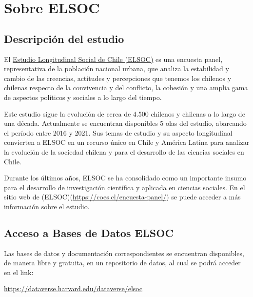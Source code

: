 \documentclass[
  12pt,
]{book}
\begin{document}
\hypertarget{sobre-elsoc}{%
\section*{Sobre ELSOC}\label{sobre-elsoc}}

\hypertarget{descripciuxf3n-del-estudio}{%
\subsection*{Descripción del estudio}\label{descripciuxf3n-del-estudio}}

El \href{https://coes.cl/encuesta-panel/}{Estudio Longitudinal Social de Chile (ELSOC)} es una encuesta panel, representativa de la población nacional urbana, que analiza la estabilidad y cambio de las creencias, actitudes y percepciones que tenemos los chilenos y chilenas respecto de la convivencia y del conflicto, la cohesión y una amplia gama de aspectos políticos y sociales a lo largo del tiempo.

Este estudio sigue la evolución de cerca de 4.500 chilenos y chilenas a lo largo de una década. Actualmente se encuentran disponibles 5 olas del estudio, abarcando el período entre 2016 y 2021. Sus temas de estudio y su aspecto longitudinal convierten a ELSOC en un recurso único en Chile y América Latina para analizar la evolución de la sociedad chilena y para el desarrollo de las ciencias sociales en Chile.

Durante los últimos años, ELSOC se ha consolidado como un importante insumo para el desarrollo de investigación científica y aplicada en ciencias sociales. En el sitio web de (ELSOC)(\url{https://coes.cl/encuesta-panel/}) se puede acceder a más información sobre el estudio.

\hypertarget{acceso-a-bases-de-datos-elsoc}{%
\subsection*{Acceso a Bases de Datos ELSOC}\label{acceso-a-bases-de-datos-elsoc}}

Las bases de datos y documentación correspondientes se encuentran disponibles, de manera libre y gratuita, en un repositorio de datos, al cual se podrá acceder en el link:

\url{https://dataverse.harvard.edu/dataverse/elsoc}
\end{document}
